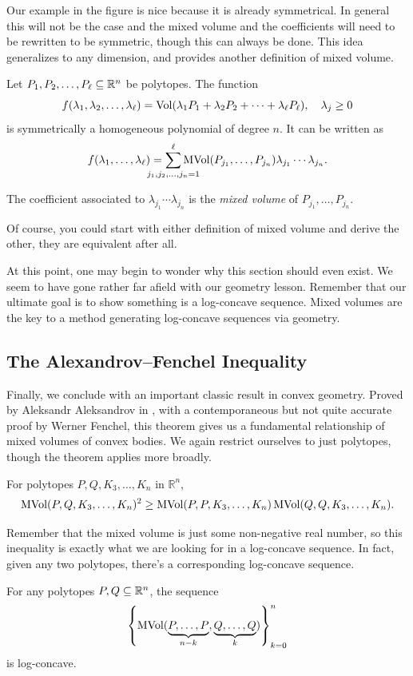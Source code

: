\documentclass[12pt,oneside]{../../sfsuthesis}
\begin{document}
Our example in the figure is nice because it is already symmetrical.
In general this will not be the case and the mixed volume and the coefficients will need to be rewritten to be symmetric, though this can always be done.
This idea generalizes to any dimension, and provides another definition of mixed volume.
\begin{definition}
    Let  \( P_1, P_2, \dots, P_\ell \subseteq \mathbb{R}^n \) be polytopes.
    The function
    \[
        f(\lambda_1, \lambda_2, \dots, \lambda_\ell)  = \operatorname{Vol}(\lambda_1 P_1 + \lambda_2 P_2 + \cdots + \lambda_\ell P_\ell), \quad \lambda_j \geq 0
    \]
    is symmetrically a homogeneous polynomial of degree \( n \).
    It can be written as
    \[
        f(\lambda_1, \dots, \lambda_\ell) = \sum_{\mathclap{j_1, j_2, \dots, j_n = 1}}^{\ell} \MVol(P_{j_1}, \dots, P_{j_n})\lambda_{j_1} \cdots \lambda_{j_n}.
    \]

    The coefficient associated to \( \lambda_{j_1} \cdots \lambda_{j_n} \) is the \emph{mixed volume} of \( P_{j_1}, \dots, P_{j_n} \).

\end{definition}
Of course, you could start with either definition of mixed volume and derive the other, they are equivalent after all.

At this point, one may begin to wonder why this section should even exist.
We seem to have gone rather far afield with our geometry lesson.
Remember that our ultimate goal is to show something is a log-concave sequence.
Mixed volumes are the key to a method generating log-concave sequences via geometry.

\subsection{The Alexandrov–Fenchel Inequality}
Finally, we conclude with an important classic result in convex geometry.
Proved by Aleksandr Aleksandrov in \cite{aleksandrovZurTheorieGemischter1937}, with a contemporaneous but not quite accurate proof by Werner Fenchel, this theorem gives us a fundamental relationship of mixed volumes of convex bodies.
We again restrict ourselves to just polytopes, though the theorem applies more broadly.
\begin{theorem}\th\label{thm:AFIneq}
    For polytopes \( P, Q, K_3, \dots, K_n \) in \( \mathbb{R}^n \),
    \begin{gather*}
        \operatorname{MVol}(P,Q, K_3, \dots, K_n)^2 \geq \operatorname{MVol}( P, P, K_3, \dots, K_n) \operatorname{MVol}( Q, Q, K_3, \dots, K_n).
    \end{gather*}
\end{theorem}
Remember that the mixed volume is just some non-negative real number, so this inequality is exactly what we are looking for in a log-concave sequence.
In fact, given any two polytopes, there's a corresponding log-concave sequence.
\begin{corollary}\th\label{thm:AFSequence}
    For any polytopes \( P, Q \subseteq \mathbb{R}^n \), the sequence
    \[
        \left\{ \operatorname{MVol}(\underbrace{P,\ldots,P}_{n-k},\underbrace{Q,\ldots,Q}_{k}) \right\}_{k=0}^{n}
    \]
    is log-concave.
\end{corollary}
\end{document}
